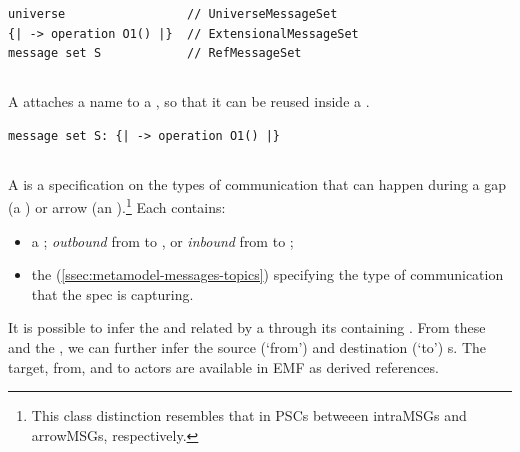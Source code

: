 \begin{lstlisting}[style=Example]
universe                 // UniverseMessageSet
{| -> operation O1() |}  // ExtensionalMessageSet
message set S            // RefMessageSet
\end{lstlisting}

\subsection{\mnamedmessageset}\label{ssec:metamodel-messages-named-sets}

A \mnamedmessageset{} attaches a name to a \mmessageset, so that it can be reused
inside a \msequence.

\begin{lstlisting}[style=Example]
message set S: {| -> operation O1() |}
\end{lstlisting}

\subsection{\mmessagespec}

A \mmessagespec{} is a specification on the types of communication that can
happen during a gap (a \mgapmessagespec) or arrow (an \marrowmessagespec).\footnote{
This class distinction resembles that in PSCs betweeen intraMSGs and arrowMSGs,
respectively.}  Each \mmessagespec{} contains:

\begin{itemize}
\item
  a \mmessagedirection; \emph{outbound} from \mtarget{} to \mworld,
  or \emph{inbound} from \mworld to \mtarget;
\item
  the \mmessagetopic{} (\cref{ssec:metamodel-messages-topics}) specifying
  the type of communication that the spec is capturing.
\end{itemize}

It is possible to infer the \mtarget{} and \mworld{} related by a
\mmessagespec{} through its containing \msequencegroup.  From these
and the \mmessagedirection, we can further infer the source (`from')
and destination (`to') \mactor s.  The target, from, and to actors are
available in EMF as derived references.

